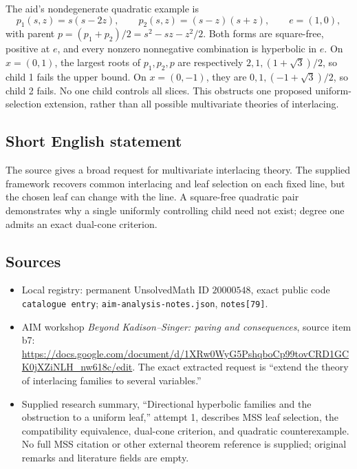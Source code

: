 \documentclass[11pt]{article}
\begin{document}
The aid's nondegenerate quadratic example is
\[
 p_1(s,z)=s(s-2z),\qquad p_2(s,z)=(s-z)(s+z),\qquad e=(1,0),
\]
with parent \(p=(p_1+p_2)/2=s^2-sz-z^2/2\). Both forms are square-free, positive at \(e\), and every nonzero nonnegative combination is hyperbolic in \(e\). On \(x=(0,1)\), the largest roots of \(p_1,p_2,p\) are respectively \(2,1,(1+\sqrt3)/2\), so child 1 fails the upper bound. On \(x=(0,-1)\), they are \(0,1,(-1+\sqrt3)/2\), so child 2 fails. No one child controls all slices. This obstructs one proposed uniform-selection extension, rather than all possible multivariate theories of interlacing.
\subsection{Short English statement}
The source gives a broad request for multivariate interlacing theory. The supplied framework recovers common interlacing and leaf selection on each fixed line, but the chosen leaf can change with the line. A square-free quadratic pair demonstrates why a single uniformly controlling child need not exist; degree one admits an exact dual-cone criterion.
\subsection{Sources}
\begin{itemize}
\item Local registry: permanent UnsolvedMath ID \(20000548\), exact public code \texttt{catalogue entry}; \texttt{aim-analysis-notes.json}, \texttt{notes[79]}.
\item AIM workshop \emph{Beyond Kadison--Singer: paving and consequences}, source item b7: \url{https://docs.google.com/document/d/1XRw0WyG5PshqboCp99tovCRD1GCK0jXZiNLH_nw618c/edit}. The exact extracted request is ``extend the theory of interlacing families to several variables.''
\item Supplied research summary, ``Directional hyperbolic families and the obstruction to a uniform leaf,'' attempt 1, describes MSS leaf selection, the compatibility equivalence, dual-cone criterion, and quadratic counterexample. No full MSS citation or other external theorem reference is supplied; original remarks and literature fields are empty.
\end{itemize}
\end{document}
